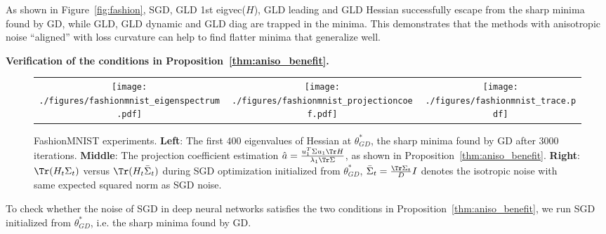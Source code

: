 \documentclass{article}
\begin{document}
As shown in Figure~\ref{fig:fashion}, SGD, GLD 1st eigvec($H$), GLD leading and GLD Hessian successfully escape from the sharp minima found by GD, while GLD, GLD dynamic and GLD diag are trapped in the minima.
This demonstrates that the methods with anisotropic noise ``aligned'' with loss curvature can help to find flatter minima that generalize well. 

\textbf{Verification of the conditions in Proposition~\ref{thm:aniso_benefit}.} \label{sec:verification}
\begin{figure}
\centering
\begin{tabular}{ccc}
    \texttt{[image: ./figures/fashionmnist\_eigenspectrum.pdf]} & \texttt{[image: ./figures/fashionmnist\_projectioncoef.pdf]} &  \texttt{[image: ./figures/fashionmnist\_trace.pdf]}
\end{tabular}
\vspace{-4mm}
\caption{\small FashionMNIST experiments.
\textbf{Left}: The first $400$ eigenvalues of Hessian at $\theta^*_{GD}$, the sharp minima found by GD after $3000$ iterations.
\textbf{Middle}: The projection coefficient estimation $\hat{a} = \frac{u_1^T \Sigma u_1 \Tr H}{\lambda_1 \Tr\Sigma}$, as shown in Proposition~\ref{thm:aniso_benefit}.
\textbf{Right}: $\Tr(H_t\Sigma_t)$ versus $\Tr(H_t\bar{\Sigma}_t)$ during SGD optimization initialized from $\theta^*_{GD}$, $\bar{\Sigma}_t = \frac{\Tr\Sigma_t}{D}I$ denotes the isotropic noise with same expected squared norm as SGD noise.}
\label{fig:sgdnoise}
\end{figure}

To check whether the noise of SGD in deep neural networks  satisfies the two conditions in Proposition~\ref{thm:aniso_benefit}, we run SGD  initialized from $\theta^*_{GD}$, i.e. the sharp minima found by GD.
\end{document}

